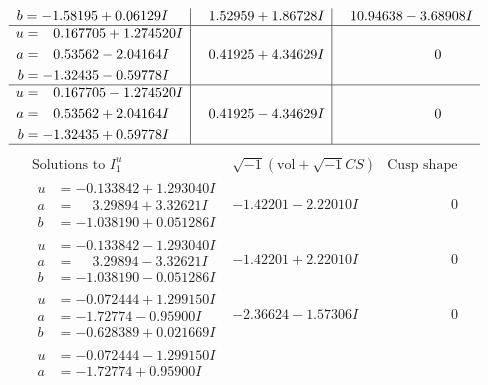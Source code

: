\documentclass[1p]{elsarticle_modified}
\theoremstyle{definition}
\newcommand{\I}{\sqrt{-1}}
\begin{document}
$$\begin{array}{c|c|c}
\begin{aligned}
b &= -1.58195 + 0.06129 I\end{aligned}
 & \phantom{-}1.52959 + 1.86728 I & \phantom{-}10.94638 - 3.68908 I \\ \hline\begin{aligned}
u &= \phantom{-}0.167705 + 1.274520 I \\
a &= \phantom{-}0.53562 - 2.04164 I \\
b &= -1.32435 - 0.59778 I\end{aligned}
 & \phantom{-}0.41925 + 4.34629 I & \phantom{-0.000000 } 0 \\ \hline\begin{aligned}
u &= \phantom{-}0.167705 - 1.274520 I \\
a &= \phantom{-}0.53562 + 2.04164 I \\
b &= -1.32435 + 0.59778 I\end{aligned}
 & \phantom{-}0.41925 - 4.34629 I & \phantom{-0.000000 } 0\\
 \hline 
 \end{array}$$\newpage$$\begin{array}{c|c|c}  
\text{Solutions to }I^u_{1}& \I (\text{vol} + \sqrt{-1}CS) & \text{Cusp shape}\\
 \hline 
\begin{aligned}
u &= -0.133842 + 1.293040 I \\
a &= \phantom{-}3.29894 + 3.32621 I \\
b &= -1.038190 + 0.051286 I\end{aligned}
 & -1.42201 - 2.22010 I & \phantom{-0.000000 } 0 \\ \hline\begin{aligned}
u &= -0.133842 - 1.293040 I \\
a &= \phantom{-}3.29894 - 3.32621 I \\
b &= -1.038190 - 0.051286 I\end{aligned}
 & -1.42201 + 2.22010 I & \phantom{-0.000000 } 0 \\ \hline\begin{aligned}
u &= -0.072444 + 1.299150 I \\
a &= -1.72774 - 0.95900 I \\
b &= -0.628389 + 0.021669 I\end{aligned}
 & -2.36624 - 1.57306 I & \phantom{-0.000000 } 0 \\ \hline\begin{aligned}
u &= -0.072444 - 1.299150 I \\
a &= -1.72774 + 0.95900 I \\

\end{aligned}
\end{array}$$
\end{document}
